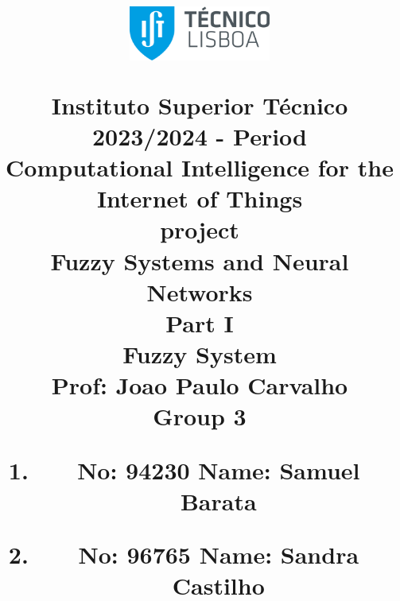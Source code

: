 \title{
\centering
\includegraphics[width=0.35\textwidth]{capa/logo.png}\par\vspace{1cm}
\normalfont \large 
Instituto Superior Técnico\\
\vspace{5mm}
\normalsize 2023/2024 -  Period \\
\vspace{15mm}
\huge \textbf{Computational Intelligence for the Internet of Things}\\
\vspace{15mm}
\huge { project}\\
\huge {Fuzzy Systems and Neural Networks}\\
\LARGE {Part I}\\
\LARGE {Fuzzy System}\\
\normalsize
\vspace{5mm}
\textbf{Prof:} Joao Paulo Carvalho\\
\vspace{15mm}
Group 3
\vspace{5mm}
\begin{enumerate}
    \centering
    \item \textbf{No:} 94230  \hspace{2cm} \textbf{Name:} Samuel Barata
    \item \textbf{No:} 96765  \hspace{2cm} \textbf{Name:} Sandra Castilho
\end{enumerate}
\vspace{25mm}
}